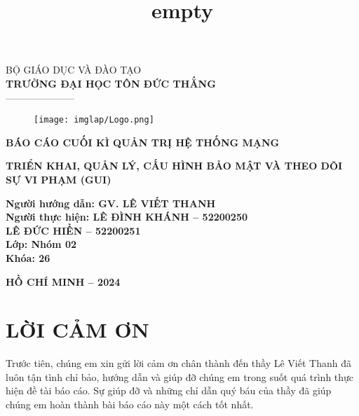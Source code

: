 \documentclass[13pt]{article}
\title{empty}
\begin{document}
	\fontsize{14pt}{20pt}\selectfont
	\begin{center}
		BỘ GIÁO DỤC VÀ ĐÀO TẠO\\\textbf{TRƯỜNG ĐẠI HỌC TÔN ĐỨC THẮNG}\\
		---------------------
	\end{center}
	\vspace{1cm}
	\begin{figure}[h]
		\centering
		\texttt{[image: imglap/Logo.png]}
	\end{figure}
	\begin{center}
		\textbf{BÁO CÁO CUỐI KÌ QUẢN TRỊ HỆ THỐNG MẠNG}
	\end{center}
	\vspace{1cm}
	\fontsize{20pt}{20pt}\selectfont
	\begin{center}
		\textbf{TRIỂN KHAI, QUẢN LÝ, CẤU HÌNH BẢO MẬT VÀ THEO DÕI SỰ VI PHẠM (GUI)}
	\end{center}
	\vspace{6cm}
        \fontsize{14pt}{17pt}\selectfont
        \begin{flushright}
            \textbf{
                Người hướng dẫn: GV. LÊ VIẾT THANH\\
                Người thực hiện: LÊ ĐÌNH KHÁNH – 52200250\\
                LÊ ĐỨC HIỀN – 52200251\\
                Lớp: Nhóm 02\\
                Khóa: 26
            }
        \end{flushright}
	\vspace{1cm}
	\fontsize{16pt}{20pt}\selectfont
	\begin{center}
		\textbf{HỒ CHÍ MINH – 2024}
	\end{center}

        \newpage
        \section*{\centering \fontsize{20pt}{24pt}\selectfont LỜI CẢM ƠN}
        Trước tiên, chúng em xin gửi lời cảm ơn chân thành đến thầy Lê Viết Thanh đã luôn tận tình chỉ bảo, hướng dẫn và giúp đỡ chúng em trong suốt quá trình thực hiện đề tài báo cáo. Sự giúp đỡ và những chỉ dẫn quý báu của thầy đã giúp chúng em hoàn thành bài báo cáo này một cách tốt nhất.
\end{document}
